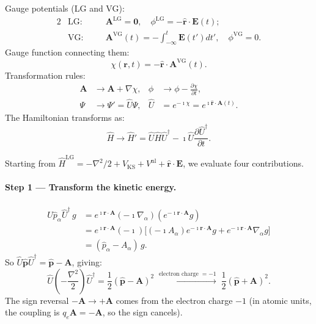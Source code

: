 \documentclass[11pt]{article}
\newcommand{\iunit}{\imath}
\newcommand{\Avec}{\mathbf{A}}
\newcommand{\Evec}{\mathbf{E}}
\newcommand{\phat}{\hat{\mathbf{p}}}
\newcommand{\rhat}{\hat{\mathbf{r}}}
\newcommand{\Vnl}{V^{\mathrm{nl}}}
\newcommand{\HLG}{\hat{H}^{\mathrm{LG}}}
\newcommand{\VKS}{V_{\mathrm{KS}}}
\begin{document}
Gauge potentials (LG and VG):
\begin{alignat}{2}
  &\text{LG:}\quad
  &&\Avec^\mathrm{LG}=\mathbf{0},\quad
  \phi^\mathrm{LG}=-\rhat\cdot\Evec(t);
  \label{eq:LG}
  \\
  &\text{VG:}\quad
  &&\Avec^\mathrm{VG}(t)=-\!\int_{-\infty}^t\Evec(t')dt',\quad
  \phi^\mathrm{VG}=0.
  \label{eq:VG}
\end{alignat}
Gauge function connecting them:
\begin{equation}
  \chi(\mathbf{r},t)
  = -\rhat\cdot\Avec^\mathrm{VG}(t).
  \label{eq:chi}
\end{equation}
Transformation rules:
\begin{align}
  \Avec &\to \Avec+\nabla\chi,
  &
  \phi &\to \phi-\frac{\partial\chi}{\partial t},
  \label{eq:gauge-rules}
  \\
  \Psi &\to \Psi' = \hat{U}\Psi,
  &
  \hat{U} &= e^{-\iunit\chi}
           = e^{\iunit\rhat\cdot\Avec(t)}.
  \label{eq:U-def}
\end{align}
The Hamiltonian transforms as:
\begin{equation}
  \hat{H}
  \to\hat{H}'
  = \hat{U}\hat{H}\hat{U}^\dagger
    - \iunit\hat{U}\frac{\partial\hat{U}^\dagger}{\partial t}.
  \label{eq:H-transform}
\end{equation}

Starting from $\HLG = -\nabla^2/2 + \VKS + \Vnl + \rhat\cdot\Evec$,
we evaluate four contributions.

\paragraph{Step 1 --- Transform the kinetic energy.}
\begin{align}
  \hat{U}\hat{p}_\alpha\hat{U}^\dagger\,g
  &= e^{\iunit\mathbf{r}\cdot\Avec}
     (-\iunit\nabla_\alpha)
     (e^{-\iunit\mathbf{r}\cdot\Avec}g)
  \nonumber\\
  &= e^{\iunit\mathbf{r}\cdot\Avec}(-\iunit)
     \bigl[(-\iunit A_\alpha)e^{-\iunit\mathbf{r}\cdot\Avec}g
     + e^{-\iunit\mathbf{r}\cdot\Avec}\nabla_\alpha g\bigr]
  \nonumber\\
  &= (\hat{p}_\alpha - A_\alpha)\,g.
  \label{eq:U-p-step}
\end{align}
So $\hat{U}\phat\hat{U}^\dagger = \phat-\Avec$, giving:
\begin{equation}
  \hat{U}\!\left(-\frac{\nabla^2}{2}\right)\hat{U}^\dagger
  = \frac{1}{2}(\phat-\Avec)^2
  \;\xrightarrow{\text{electron charge }=-1}\;
  \frac{1}{2}(\phat+\Avec)^2.
  \label{eq:T-VG}
\end{equation}
The sign reversal $-\Avec\to+\Avec$ comes from the electron charge
$-1$ (in atomic units, the coupling is $q_e\Avec=-\Avec$, so the
sign cancels).
\end{document}
